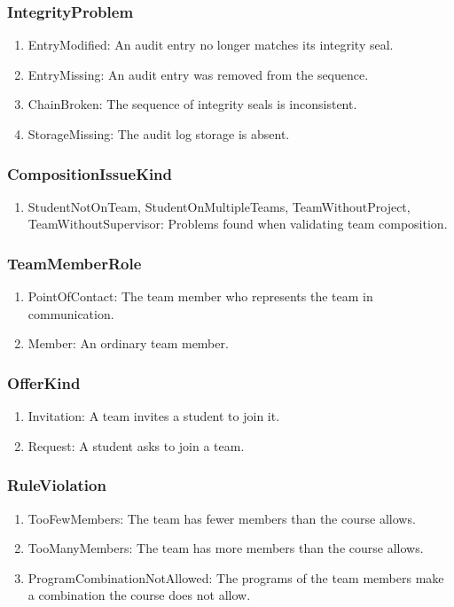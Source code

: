 \documentclass[12pt, titlepage]{article}
\begin{document}
\subsubsection{IntegrityProblem}
\begin{enumerate}
    \item EntryModified: An audit entry no longer matches its integrity seal.
    \item EntryMissing: An audit entry was removed from the sequence.
    \item ChainBroken: The sequence of integrity seals is inconsistent.
    \item StorageMissing: The audit log storage is absent.
\end{enumerate}

\subsubsection{CompositionIssueKind}
\begin{enumerate}
    \item StudentNotOnTeam, StudentOnMultipleTeams, TeamWithoutProject,
    TeamWithoutSupervisor: Problems found when validating team composition.
\end{enumerate}

\subsubsection{TeamMemberRole}
\begin{enumerate}
    \item PointOfContact: The team member who represents the team in communication.
    \item Member: An ordinary team member.
\end{enumerate}

\subsubsection{OfferKind}
\begin{enumerate}
    \item Invitation: A team invites a student to join it.
    \item Request: A student asks to join a team.
\end{enumerate}

\subsubsection{RuleViolation}
\begin{enumerate}
    \item TooFewMembers: The team has fewer members than the course allows.
    \item TooManyMembers: The team has more members than the course allows.
    \item ProgramCombinationNotAllowed: The programs of the team members make a combination the course does not allow.
\end{enumerate}
\end{document}
